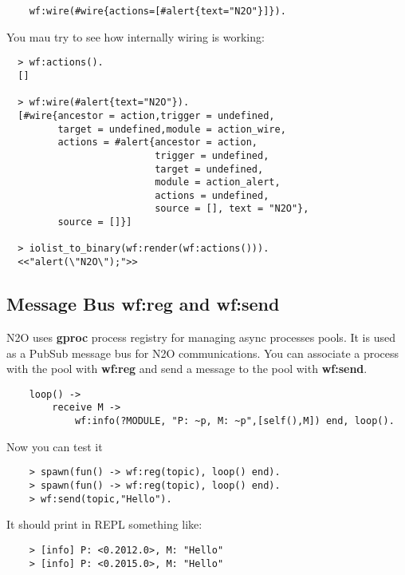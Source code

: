 \vspace{1\baselineskip}
\begin{lstlisting}
    wf:wire(#wire{actions=[#alert{text="N2O"}]}).
\end{lstlisting}
\vspace{1\baselineskip}

You mau try to see how internally wiring is working:

\begin{lstlisting}
  > wf:actions().
  []

  > wf:wire(#alert{text="N2O"}).
  [#wire{ancestor = action,trigger = undefined,
         target = undefined,module = action_wire,
         actions = #alert{ancestor = action,
                          trigger = undefined,
                          target = undefined,
                          module = action_alert,
                          actions = undefined,
                          source = [], text = "N2O"},
         source = []}]

  > iolist_to_binary(wf:render(wf:actions())).
  <<"alert(\"N2O\");">>
\end{lstlisting}

\newpage
\subsection{Message Bus {\bf wf:reg} and {\bf wf:send}}
N2O uses {\bf gproc} process registry for managing async processes pools.
It is used as a PubSub message bus for N2O communications.
You can associate a process with the pool with {\bf wf:reg}
and send a message to the pool with {\bf wf:send}.

\vspace{1\baselineskip}
\begin{lstlisting}
    loop() ->
        receive M ->
            wf:info(?MODULE, "P: ~p, M: ~p",[self(),M]) end, loop().
\end{lstlisting}

Now you can test it

\begin{lstlisting}
    > spawn(fun() -> wf:reg(topic), loop() end).
    > spawn(fun() -> wf:reg(topic), loop() end).
    > wf:send(topic,"Hello").
\end{lstlisting}

It should print in REPL something like:

\begin{lstlisting}
    > [info] P: <0.2012.0>, M: "Hello"
    > [info] P: <0.2015.0>, M: "Hello"
\end{lstlisting}

